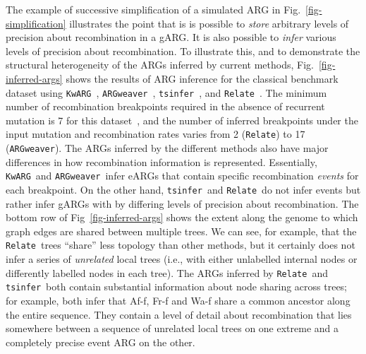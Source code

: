 \documentclass{article}
\newcommand{\tsinfer}[0]{\texttt{tsinfer}}
\newcommand{\kwarg}[0]{\texttt{KwARG}}
\newcommand{\argweaver}[0]{\texttt{ARGweaver}}
\newcommand{\relate}[0]{\texttt{Relate}}
\begin{document}
The example of successive simplification of a simulated ARG
in Fig.~\ref{fig-simplification} illustrates the point
that is is possible to \emph{store} arbitrary levels of precision
about recombination in a gARG.
It is also possible to \emph{infer} various levels of precision about
recombination.
To illustrate this, and to demonstrate the structural
heterogeneity of the ARGs inferred  by current methods,
Fig.~\ref{fig-inferred-args} shows the results of ARG inference
for the classical \citet{kreitman1983nucleotide} benchmark dataset
using  \kwarg~\citep{ignatieva2021kwarg},
\argweaver~\citep{rasmussen2014genome,hubisz2020inference},
\tsinfer~\citep{kelleher2019inferring},
and \relate~\citep{speidel2019method}.
The minimum number
of recombination breakpoints required in the absence of recurrent mutation
is 7 for this dataset~\citep{song2003parsimonious},
and the number of inferred breakpoints
under the input mutation and recombination rates
varies from 2 (\relate) to 17 (\argweaver).
The ARGs inferred by the different methods also have major differences
in how recombination information is represented.
Essentially,
\kwarg\ and \argweaver\ infer eARGs that contain
specific recombination \emph{events} for each breakpoint.
On the other hand, \tsinfer\ and
\relate\ do not infer events but rather
infer gARGs with by differing levels of precision about recombination.
The bottom row of Fig~\ref{fig-inferred-args} shows the extent along
the genome to which graph edges are shared between multiple trees.
We can see, for example, that the \relate\ trees ``share'' less topology
than other methods, but it certainly does not infer a series of
\emph{unrelated} local trees (i.e., with either unlabelled internal
nodes or differently labelled nodes in each tree).
The ARGs inferred by \relate\ and \tsinfer\ both contain substantial
information about node sharing across trees; for example,
both infer that Af-f, Fr-f and Wa-f share a common ancestor along
the entire sequence.
They contain a level of detail about recombination
that lies somewhere between a sequence of unrelated local trees on one
extreme and a completely precise event ARG on the other.
\end{document}
